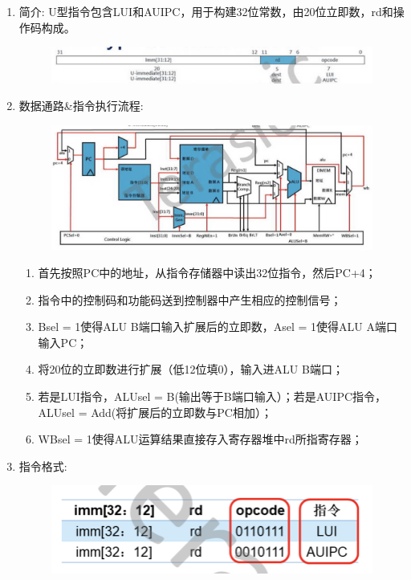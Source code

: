 \documentclass[a4paper, 14pt, oneside]{book} %
\numberwithin{equation}{subsection}
\begin{document}
\begin{enumerate}
					\begin{enumerate}
						\item{简介:}
							\subitem
								U型指令包含LUI和AUIPC，用于构建32位常数，由20位立即数，rd和操作码构成。
								\begin{figure}[!htbp]
									\centering
									\includegraphics[scale=0.5]{img/u1.png}
								\end{figure}
						\item{数据通路\&指令执行流程:}
							\begin{figure}[!htbp]
								\centering
								\includegraphics[scale=0.5]{img/u2.png}
							\end{figure}
							\begin{enumerate}
								\item
									首先按照PC中的地址，从指令存储器中读出32位指令，然后PC+4；
								\item
									指令中的控制码和功能码送到控制器中产生相应的控制信号；
								\item
									Bsel = 1使得ALU B端口输入扩展后的立即数，Asel = 1使得ALU A端口输入PC；
								\item
									将20位的立即数进行扩展（低12位填0），输入进ALU B端口；
								\item
									若是LUI指令，ALUsel = B(输出等于B端口输入）；若是AUIPC指令， ALUsel = Add(将扩展后的立即数与PC相加）；
								\item
									WBsel = 1使得ALU运算结果直接存入寄存器堆中rd所指寄存器；
							\end{enumerate}
						\item{指令格式:}
							\begin{figure}[!htbp]
								\centering
								\includegraphics[scale=0.5]{img/u3.png}

\end{figure}
\end{enumerate}
\end{enumerate}
\end{document}

